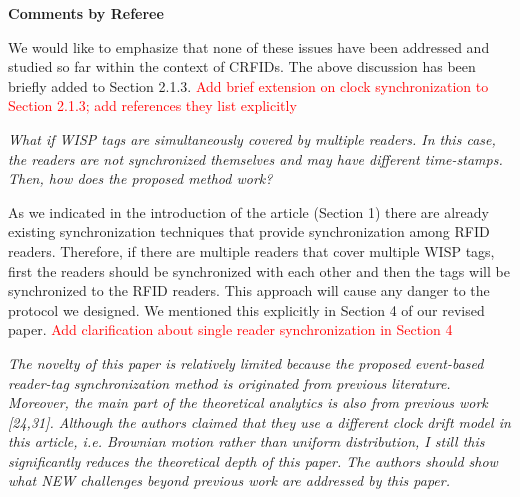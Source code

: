 \documentclass[10pt]{article}
\newcommand{\referee}[1]{
	{\item \color{OliveGreen} \emph{{#1}}}
	\label{R\therefereeCounter:\arabic{enumi}}
}
\newcommand{\response}[1]{{\color{blue} #1}}
\newcounter{refereeCounter}
\newenvironment{responses}{%
\refstepcounter{refereeCounter}%
\textbf{\large Comments by Referee \therefereeCounter}
\begin{enumerate}%
\renewcommand{\labelenumi}{\textbf{[R\therefereeCounter :\,\arabic{enumi}]}} %
}{\end{enumerate}}
\begin{document}
\begin{responses}
{We would like to emphasize that none of these issues have been addressed and studied so far within the context of CRFIDs. The above discussion has been briefly added to Section 2.1.3. \textcolor{red}{Add brief extension on clock synchronization to Section 2.1.3; add references they list explicitly}}

\referee{What if WISP tags are simultaneously covered by multiple readers. In this case, the readers are not synchronized themselves and may have different time-stamps. Then, how does the proposed method work?}

\response{As we indicated in the introduction of the article (Section 1) there are already existing synchronization techniques that provide synchronization among RFID readers. Therefore, if there are multiple readers that cover multiple WISP tags, first the readers should be synchronized with each other and then the tags will be synchronized to the RFID readers. This approach will cause any danger to the protocol we designed. We mentioned this explicitly in Section 4 of our revised paper. \textcolor{red}{Add clarification about single reader synchronization in Section 4}}
	
\referee{The novelty of this paper is relatively limited because the proposed event-based reader-tag synchronization method is originated from previous literature. Moreover, the main part of the theoretical analytics is also from previous work [24,31]. Although the authors claimed that they use a different clock drift model in this article, i.e. Brownian motion rather than uniform distribution, I still this significantly reduces the theoretical depth of this paper. The authors should show what NEW challenges beyond previous work are addressed by this paper.}


\end{responses}
\end{document}
